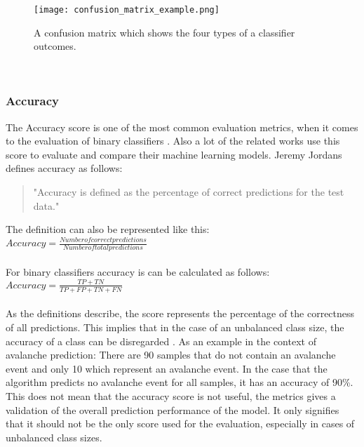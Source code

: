 \documentclass[../masterarbeit.tex]{subfiles}
\begin{document}
\begin{figure}[h]
    \centering
    \texttt{[image: confusion\_matrix\_example.png]}
    \caption{A confusion matrix which shows the four types of a classifier outcomes.}
\end{figure} \\









\subsubsection{Accuracy}
The Accuracy score is one of the most common evaluation metrics, when it comes to the evaluation of binary classifiers \textcite[]{Kartik_evaluation:2022}. Also a lot of the related works use this score to evaluate and compare their machine learning models. Jeremy Jordans defines accuracy as follows:
\begin{quote}
	"Accuracy is defined as the percentage of correct predictions for the test data." \autocite{jeremyjordan_evaluation:2022}
\end{quote}
The definition can also be represented like this: 
\\
\(Accuracy = \frac{Number of correct predictions}{Number of total predictions} \) \hfill \textcite[]{Google_Acurracy:2022} \\~\\
For binary classifiers accuracy is can be calculated as follows: \\
\(Accuracy = \frac{TP + TN}{TP + FP + TN + FN} \) \hfill \textcite[]{Kartik_evaluation:2022} \\~\\
As the definitions describe, the score represents the percentage of the correctness of all predictions. This implies that in the case of an unbalanced class size, the accuracy of a class can be disregarded \textcite[]{Kartik_evaluation:2022}. As an example in the context of avalanche prediction: There are 90 samples that do not contain an avalanche event and only 10 which represent an avalanche event. In the case that the algorithm predicts no avalanche event for all samples, it has an accuracy of 90\%. \\
This does not mean that the accuracy score is not useful, the metrics gives a validation of the overall prediction performance of the model. It only signifies that it should not be the only score used for the evaluation, especially in cases of unbalanced class sizes. \autocite[]{Google_Acurracy:2022} \\~\\
\end{document}
